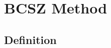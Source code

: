 \documentclass{beamer}
\newcommand{\benum}{\begin{equation}}   %
\newcommand{\eenum}{\end{equation}}
\newcommand{\bea}{\begin{eqnarray*}}  %
\newcommand{\eea}{\end{eqnarray*}}
\newcommand{\beanum}{\begin{eqnarray}}  %
\newcommand{\eeanum}{\end{eqnarray}}
\newcommand{\B}[1]{\ensuremath{B_{#1} }}			%
\newcommand{\omg}{\ensuremath{\vec{\Omega}}}
\begin{document}
%
%
%
%
%
%





\section{BCSZ Method}
\subsection{Definition}
\end{document}
